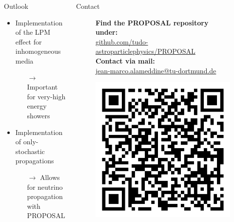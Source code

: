 \documentclass[t]{beamer}
\newlength{\itemseparation}
\begin{document}
  \begin{columns}[onlytextwidth]%
    \begin{column}{0.4\textwidth}%
      \begin{block}[equal height group=Z]{Outlook}%
        \begin{itemize}
          \setlength\itemsep{\itemseparation}
          \item Implementation of the LPM effect for inhomogeneous media
          \begin{itemize}
            \setlength\itemsep{\itemseparation}
            \item[$\rightarrow$] Important for very-high energy showers
          \end{itemize}
          \item Implementation of only-stochastic propagations
          \begin{itemize}
            \setlength\itemsep{\itemseparation}
            \item[$\rightarrow$] Allows for neutrino propagation with PROPOSAL
          \end{itemize}
        \end{itemize}
      \end{block}
    \end{column}
    \begin{column}{0.4\textwidth}%
      \begin{block}[equal height group=Z]{Contact}%
        \begin{center}
          \begin{figure}[ht]
            \begin{minipage}[ht]{0.75\linewidth}
              \textbf{Find the PROPOSAL repository under:}\\ \url{github.com/tudo-astroparticlephysics/PROPOSAL} \vspace{0.5em}\\
              \textbf{Contact via mail:}\\ \href{mailto:me@jean-marco.alameddine@tu-dortmund.de}{jean-marco.alameddine@tu-dortmund.de} 
            \end{minipage}
            \begin{minipage}[ht]{0.24\linewidth}
              \centering
                \includegraphics[width=0.66\linewidth, valign=t]{plots/qr_proposal.png}

\end{minipage}
\end{figure}
\end{center}
\end{block}
\end{column}
\end{columns}
\end{document}
